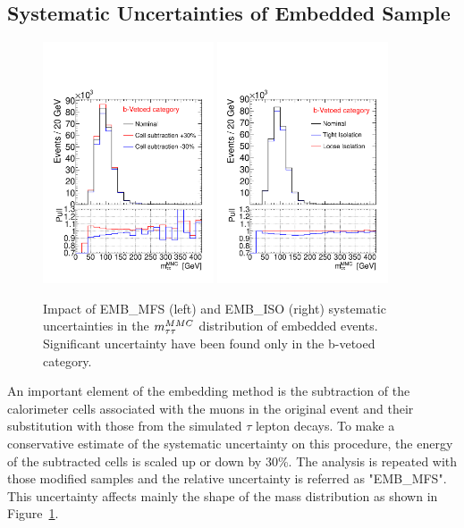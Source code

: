 \subsection{Systematic Uncertainties of  \Ztautau Embedded Sample}\label{sec:embsys}
\begin{figure}[!t]
	\begin{center}
	\includegraphics[width=0.45\textwidth]{figure/systematics/emb_sys_veto_MFS.pdf}
	\includegraphics[width=0.45\textwidth]{figure/systematics/emb_sys_veto_iso.pdf}
	\end{center}
	\caption{Impact of EMB\_MFS (left) and EMB\_ISO (right) systematic uncertainties in the $m_{\tau\tau}^{MMC}$ distribution of  embedded events.
	Significant uncertainty have been found only in the b-vetoed category.}
	\label{fig:EMBMFS}
\end{figure}

An important element of the embedding method is the subtraction of the 
calorimeter cells associated with the muons in the original \Zmumu event and their substitution with those from the simulated $\tau$ lepton
decays. To make a conservative estimate of the systematic uncertainty on this procedure, 
the energy of the subtracted cells is scaled up or down by 30\%. The analysis is repeated with those modified 
samples and the relative uncertainty is referred as "EMB\_MFS". This uncertainty affects mainly the shape of the \mmc mass 
distribution as shown in Figure~\ref{fig:EMBMFS}.



